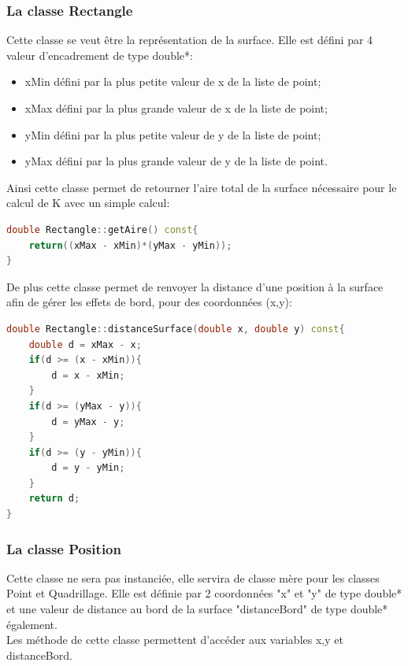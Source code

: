 \documentclass[stage2a]{tnreport}
\begin{document}
\subsubsection{La classe Rectangle}
Cette classe se veut être la représentation de la surface. Elle est défini par 4 valeur d'encadrement de type \gls{double}*:
\begin{itemize}
\item xMin défini par la plus petite valeur de x de la liste de point;
\item xMax défini par la plus grande valeur de x de la liste de point;
\item yMin défini par la plus petite valeur de y de la liste de point;
\item yMax défini par la plus grande valeur de y de la liste de point.\\
\end{itemize}

Ainsi cette classe permet de retourner l'aire total de la surface nécessaire pour le calcul de K avec un simple calcul:
\begin{lstlisting}[language=C++, caption={Méthode donnant l'aire de la surface}, label={lst:aireSurface}]
double Rectangle::getAire() const{
	return((xMax - xMin)*(yMax - yMin));
}
\end{lstlisting}
    
De plus cette classe permet de renvoyer la distance d'une position à la surface afin de gérer les effets de bord, pour des coordonnées (x,y):
\begin{lstlisting}[language=C++, caption={Méthode donnant la distance d'un point à la surface}, label={lst:distanceSurface}]
double Rectangle::distanceSurface(double x, double y) const{
	double d = xMax - x;
	if(d >= (x - xMin)){
		d = x - xMin;
	}
	if(d >= (yMax - y)){
		d = yMax - y;
	}
	if(d >= (y - yMin)){
		d = y - yMin;
	}
	return d;
}
\end{lstlisting}

\subsubsection{La classe Position}
Cette classe ne sera pas instanciée, elle servira de classe mère pour les classes Point et Quadrillage. Elle est définie par 2 coordonnées "x" et "y" de type \gls{double}* et une valeur de distance au bord de la surface "distanceBord" de type \gls{double}* également.\\

Les méthode de cette classe permettent d'accéder aux variables x,y et distanceBord.
\end{document}
